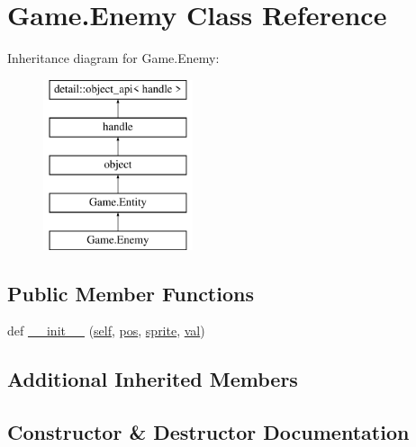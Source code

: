 \hypertarget{class_game_1_1_enemy}{}\section{Game.\+Enemy Class Reference}
\label{class_game_1_1_enemy}
Inheritance diagram for Game.\+Enemy\+:\begin{figure}[H]
\begin{center}
\leavevmode
\includegraphics[height=5.000000cm]{class_game_1_1_enemy}
\end{center}
\end{figure}
\subsection*{Public Member Functions}
\begin{DoxyCompactItemize}
\item 
def \mbox{\hyperlink{class_game_1_1_enemy_afbad0e6bbc6f5db289990552f81ff848}{\+\_\+\+\_\+init\+\_\+\+\_\+}} (\mbox{\hyperlink{modsupport_8h_a0180ca1808366e5da641475e8bf8cca3}{self}}, \mbox{\hyperlink{class_game_1_1_entity_a982b731c21081324b5809d7a88781b43}{pos}}, \mbox{\hyperlink{class_game_1_1_entity_ac8064353c61c836135c530e8fc77842b}{sprite}}, \mbox{\hyperlink{_s_d_l__opengl__glext_8h_a26942fd2ed566ef553eae82d2c109c8f}{val}})
\end{DoxyCompactItemize}
\subsection*{Additional Inherited Members}


\subsection{Constructor \& Destructor Documentation}
\mbox{\label{class_game_1_1_enemy_afbad0e6bbc6f5db289990552f81ff848}} 

